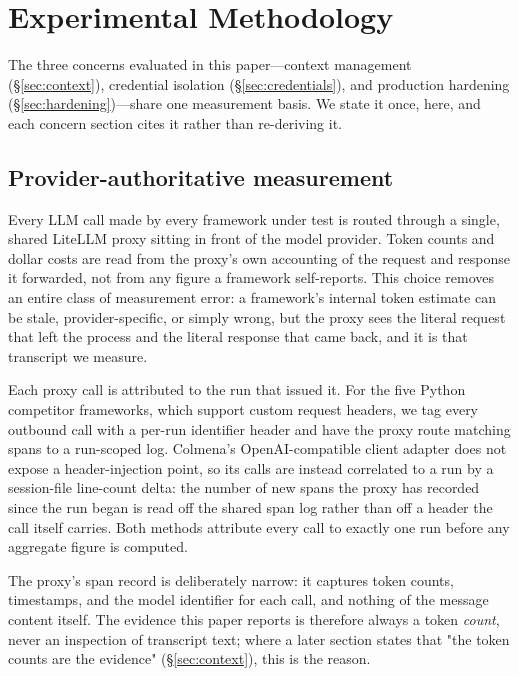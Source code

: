 \section{Experimental Methodology}
\label{sec:methodology}

The three concerns evaluated in this paper---context management
(\S\ref{sec:context}), credential isolation (\S\ref{sec:credentials}), and
production hardening (\S\ref{sec:hardening})---share one measurement basis.
We state it once, here, and each concern section cites it rather than
re-deriving it.

\subsection{Provider-authoritative measurement}
\label{subsec:method-proxy}

Every LLM call made by every framework under test is routed through a
single, shared LiteLLM proxy sitting in front of the model provider. Token
counts and dollar costs are read from the proxy's own accounting of the
request and response it forwarded, not from any figure a framework
self-reports. This choice removes an entire class of measurement error: a
framework's internal token estimate can be stale, provider-specific, or
simply wrong, but the proxy sees the literal request that left the process
and the literal response that came back, and it is that transcript we
measure.

Each proxy call is attributed to the run that issued it. For the five
Python competitor frameworks, which support custom request headers, we tag
every outbound call with a per-run identifier header and have the proxy
route matching spans to a run-scoped log. Colmena's OpenAI-compatible
client adapter does not expose a header-injection point, so its calls are
instead correlated to a run by a session-file line-count delta: the number
of new spans the proxy has recorded since the run began is read off the
shared span log rather than off a header the call itself carries. Both
methods attribute every call to exactly one run before any aggregate figure
is computed.

The proxy's span record is deliberately narrow: it captures token counts,
timestamps, and the model identifier for each call, and nothing of the
message content itself. The evidence this paper reports is therefore
always a token \emph{count}, never an inspection of transcript text; where
a later section states that "the token counts are the evidence"
(\S\ref{sec:context}), this is the reason.

